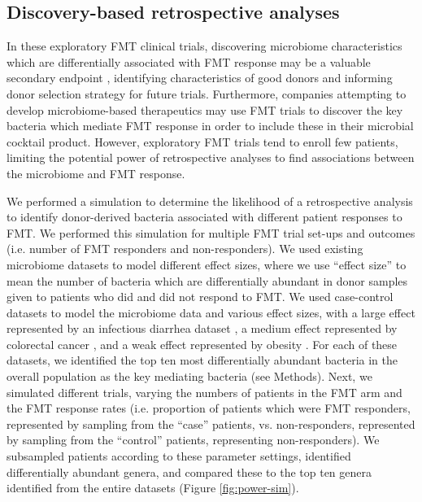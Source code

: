 \subsection{Discovery-based retrospective analyses}

In these exploratory FMT clinical trials, discovering microbiome characteristics which are differentially associated with FMT response may be a valuable secondary endpoint \cite{Olesen2018}, identifying characteristics of good donors and informing donor selection strategy for future trials.
Furthermore, companies attempting to develop microbiome-based therapeutics may use FMT trials to discover the key bacteria which mediate FMT response in order to include these in their microbial cocktail product.
However, exploratory FMT trials tend to enroll few patients, limiting the potential power of retrospective analyses to find associations between the microbiome and FMT response.

We performed a simulation to determine the likelihood of a retrospective analysis to identify donor-derived bacteria associated with different patient responses to FMT.
We performed this simulation for multiple FMT trial set-ups and outcomes (i.e. number of FMT responders and non-responders).
We used existing microbiome datasets to model different effect sizes, where we use ``effect size'' to mean the number of bacteria which are differentially abundant in donor samples given to patients who did and did not respond to FMT.
We used case-control datasets to model the microbiome data and various effect sizes, with a large effect represented by an infectious diarrhea dataset \cite{Schubert2014}, a medium effect represented by colorectal cancer \cite{Baxter2016}, and a weak effect represented by obesity \cite{Goodrich2014}.
For each of these datasets, we identified the top ten most differentially abundant bacteria in the overall population as the key mediating bacteria (see Methods).
Next, we simulated different trials, varying the numbers of patients in the FMT arm and the FMT response rates (i.e. proportion of patients which were FMT responders, represented by sampling from the ``case'' patients, vs. non-responders, represented by sampling from the ``control'' patients, representing non-responders).
We subsampled patients according to these parameter settings, identified differentially abundant genera, and compared these to the top ten genera identified from the entire datasets (Figure \ref{fig:power-sim}).


